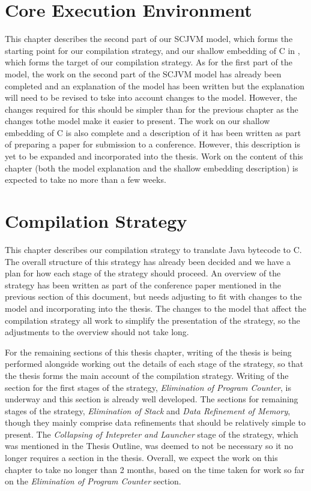 \documentclass[a4paper,12pt]{article}
\begin{document}
\section{Core Execution Environment}

This chapter describes the second part of our SCJVM model, which forms
the starting point for our compilation strategy, and our shallow
embedding of C in \Circus{}, which forms the target of our compilation
strategy.
As for the first part of the model, the work on the second part of the
SCJVM model has already been completed and an explanation of the model
has been written but the explanation will need to be revised to tske
into account changes to the model.
However, the changes required for this should be simpler than for the
previous chapter as the changes tothe model make it easier to present.
The work on our shallow embedding of C is also complete and a
description of it has been written as part of preparing a paper for
submission to a conference.
However, this description is yet to be expanded and incorporated into
the thesis. 
Work on the content of this chapter (both the model explanation and
the shallow embedding description) is expected to take no more than a
few weeks.

\section{Compilation Strategy}

This chapter describes our compilation strategy to translate Java
bytecode to C.
The overall structure of this strategy has already been decided and we
have a plan for how each stage of the strategy should proceed.
An overview of the strategy has been written as part of the conference
paper mentioned in the previous section of this document, but needs adjusting to fit
with changes to the model and incorporating into the thesis.
The changes to the model that affect the compilation strategy all work
to simplify the presentation of the strategy, so the adjustments to
the overview should not take long.

For the remaining sections of this thesis chapter, writing of the
thesis is being performed alongside working out the details of each
stage of the strategy, so that the thesis forms the main account of
the compilation strategy.
Writing of the section for the first stages of the strategy,
\emph{Elimination of Program Counter}, is underway and this section is
already well developed.
The sections for remaining stages of the strategy, \emph{Elimination
  of Stack} and \emph{Data Refinement of Memory}, though they mainly
comprise data refinements that should be relatively simple to present.
The \emph{Collapsing of Intepreter and Launcher} stage of the
strategy, which was mentioned in the Thesis Outline, was deemed to not
be necessary so it no longer requires a section in the thesis.
Overall, we expect the work on this chapter to take no longer than 2
months, based on the time taken for work so far on the
\emph{Elimination of Program Counter} section.
\end{document}
